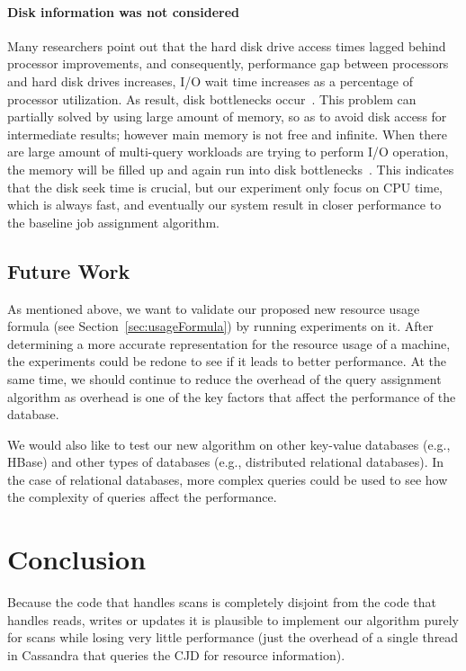\paragraph{Disk information was not considered}
Many researchers point out that the hard disk drive access times lagged behind processor improvements, and consequently, performance gap between processors and hard disk drives increases, I/O wait time increases as a percentage of processor utilization. As result, disk bottlenecks occur~\cite{IBM-IO, TMS-SSD}. This problem can partially solved by using large amount of memory, so as to avoid disk access for intermediate results; however main memory is not free and infinite. When there are large amount of multi-query workloads are trying to perform I/O operation, the memory will be filled up and again run into disk bottlenecks~\cite{Bouganim:1998:MSL:288627.288646}. This indicates that the disk seek time is crucial, but our experiment only focus on CPU time, which is always fast, and eventually our system result in closer performance to the baseline job assignment algorithm.

\subsection{Future Work}
As mentioned above, we want to validate our proposed new resource usage formula (see Section~\ref{sec:usageFormula}) by running experiments on it. After determining a more accurate representation for the resource usage of a machine, the experiments could be redone to see if it leads to better performance. At the same time, we should continue to reduce the overhead of the query assignment algorithm as overhead is one of the key factors that affect the performance of the database.

We would also like to test our new algorithm on other key-value databases (e.g., HBase) and other types of databases (e.g., distributed relational databases). In the case of relational databases, more complex queries could be used to see how the complexity of queries affect the performance.

\section{Conclusion}
\label{sec:conclusion}

Because the code that handles scans is completely disjoint from the code that handles reads, writes or updates it is plausible to implement our algorithm purely for scans while losing very little performance (just the overhead of a single thread in Cassandra that queries the CJD for resource information).
